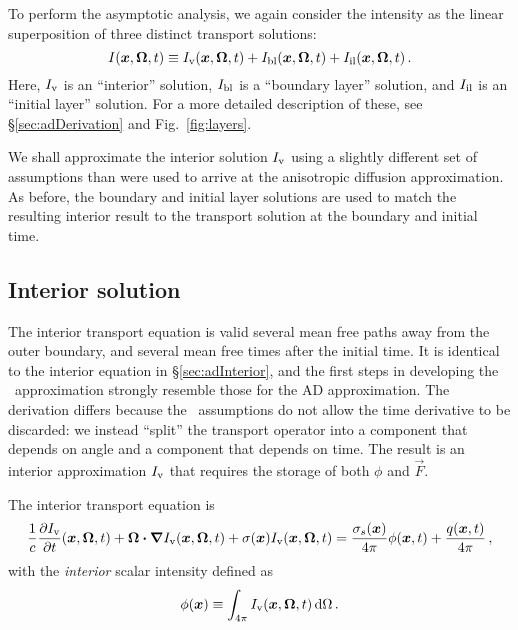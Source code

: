 To perform the asymptotic analysis, we again consider the intensity as the
linear superposition of three distinct transport solutions:
\begin{equation} \label{eq:tdSuperposition_4}
  I(\bm{x},\bm{\Omega},t)
  \equiv I_\mathrm{v}(\bm{x},\bm{\Omega},t)
  + I_\mathrm{bl}(\bm{x},\bm{\Omega},t)
  + I_\mathrm{il}(\bm{x},\bm{\Omega},t)\,.
\end{equation}
Here, $I_\mathrm{v}$ is an ``interior'' solution, $I_\mathrm{bl}$ is a ``boundary layer'' solution,
and $I_\mathrm{il}$ is an ``initial layer'' solution. For a more detailed description of
these, see \S\ref{sec:adDerivation} and Fig.~\ref{fig:layers}.

We shall approximate the interior solution $I_\mathrm{v}$ using a slightly different set
of assumptions than were used to arrive at the anisotropic diffusion
approximation. As before, the boundary and
initial layer solutions are used to match the resulting interior result
to the transport solution at the boundary and initial time.

\subsection{Interior solution}

The interior transport equation is valid several mean free paths away from the
outer boundary, and several mean free times after the initial time.
It is identical to the interior equation in \S\ref{sec:adInterior}, and
the first steps in developing the \APone\ approximation strongly resemble those
for the AD approximation.
The derivation differs because the \APone\
assumptions do not allow the time derivative to be discarded: we instead
``split'' the transport operator into a component that depends on angle and a
component that depends on time. The result is an interior approximation $I_\mathrm{v}$
that requires the storage of both $\phi$ and $\vec{F}$.

The interior transport equation is
\begin{equation} \label{eq:tdVol_4}
  \frac{1}{c}\frac{\partial I_\mathrm{v}}{\partial t}(\bm{x},\bm{\Omega},t)
  + \bm{\Omega}\bm{\cdot} \bm{\nabla} I_\mathrm{v}(\bm{x},\bm{\Omega},t)
  + \sigma(\bm{x}) I_\mathrm{v}(\bm{x},\bm{\Omega},t)
  = \frac{\sigma_s(\bm{x})}{4\pi}
  \phi(\bm{x},t) + \frac{q(\bm{x},t)}{4\pi} \,,
\end{equation}
with the \emph{interior} scalar intensity defined as
\begin{equation} \label{eq:tdPhi_4}
  \phi(\bm{x}) \equiv \int_{4\pi} I_\mathrm{v}(\bm{x}, \bm{\Omega},t) \mathop{}\!\mathrm{d} \Omega\,.
\end{equation}

